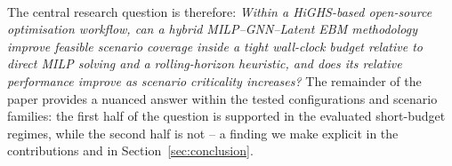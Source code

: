 \documentclass{article}
\begin{document}
\paragraph{}
The central research question is therefore:
\emph{Within a HiGHS-based open-source optimisation workflow, can a hybrid MILP--GNN--Latent EBM methodology improve feasible scenario coverage inside a tight wall-clock budget relative to direct MILP solving and a rolling-horizon heuristic, and does its relative performance improve as scenario criticality increases?} The remainder of the paper provides a nuanced answer within the tested configurations and scenario families: the first half of the question is supported in the evaluated short-budget regimes, while the second half is not -- a finding we make explicit in the contributions and in Section~\ref{sec:conclusion}.
\end{document}
